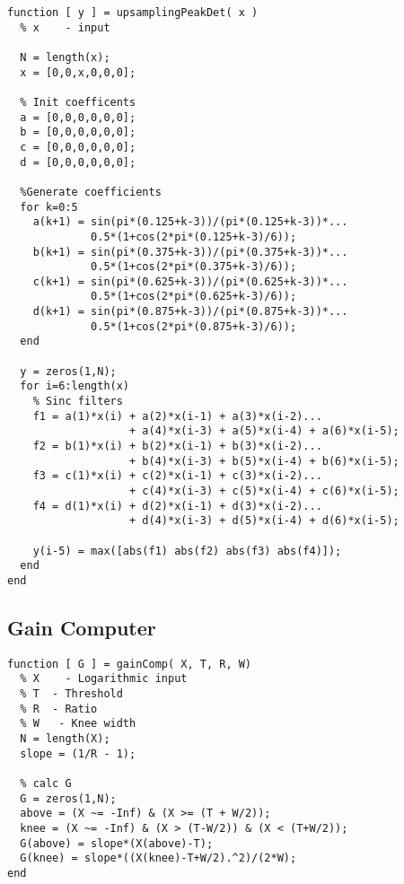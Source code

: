 \documentclass[../main2.tex]{subfiles}
\begin{document}

\begin{lstlisting}[style=customc]
function [ y ] = upsamplingPeakDet( x )
  % x    - input

  N = length(x);
  x = [0,0,x,0,0,0];
    
  % Init coefficents
  a = [0,0,0,0,0,0];
  b = [0,0,0,0,0,0];
  c = [0,0,0,0,0,0];
  d = [0,0,0,0,0,0];
    
  %Generate coefficients
  for k=0:5
    a(k+1) = sin(pi*(0.125+k-3))/(pi*(0.125+k-3))*...
             0.5*(1+cos(2*pi*(0.125+k-3)/6));
    b(k+1) = sin(pi*(0.375+k-3))/(pi*(0.375+k-3))*...
             0.5*(1+cos(2*pi*(0.375+k-3)/6));
    c(k+1) = sin(pi*(0.625+k-3))/(pi*(0.625+k-3))*...
             0.5*(1+cos(2*pi*(0.625+k-3)/6));
    d(k+1) = sin(pi*(0.875+k-3))/(pi*(0.875+k-3))*...
             0.5*(1+cos(2*pi*(0.875+k-3)/6));
  end
    
  y = zeros(1,N);
  for i=6:length(x) 
    % Sinc filters
    f1 = a(1)*x(i) + a(2)*x(i-1) + a(3)*x(i-2)...
                   + a(4)*x(i-3) + a(5)*x(i-4) + a(6)*x(i-5);
    f2 = b(1)*x(i) + b(2)*x(i-1) + b(3)*x(i-2)...
                   + b(4)*x(i-3) + b(5)*x(i-4) + b(6)*x(i-5);
    f3 = c(1)*x(i) + c(2)*x(i-1) + c(3)*x(i-2)...
                   + c(4)*x(i-3) + c(5)*x(i-4) + c(6)*x(i-5);
    f4 = d(1)*x(i) + d(2)*x(i-1) + d(3)*x(i-2)...
                   + d(4)*x(i-3) + d(5)*x(i-4) + d(6)*x(i-5);
                  
    y(i-5) = max([abs(f1) abs(f2) abs(f3) abs(f4)]);
  end
end
\end{lstlisting}


\subsection{Gain Computer}
\begin{lstlisting}[style=customc]
function [ G ] = gainComp( X, T, R, W)
  % X    - Logarithmic input 
  % T  - Threshold
  % R  - Ratio
  % W   - Knee width
  N = length(X);
  slope = (1/R - 1);
    
  % calc G
  G = zeros(1,N);
  above = (X ~= -Inf) & (X >= (T + W/2));
  knee = (X ~= -Inf) & (X > (T-W/2)) & (X < (T+W/2));
  G(above) = slope*(X(above)-T);
  G(knee) = slope*((X(knee)-T+W/2).^2)/(2*W);
end
\end{lstlisting}

\end{document}
